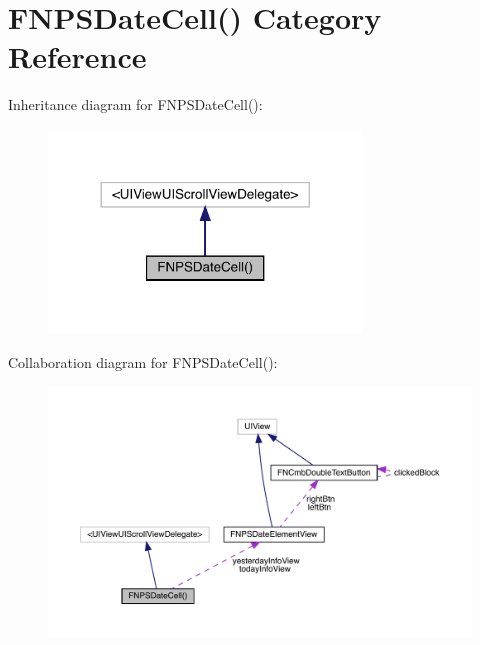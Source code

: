 \hypertarget{category_f_n_p_s_date_cell_07_08}{}\section{F\+N\+P\+S\+Date\+Cell() Category Reference}
\label{category_f_n_p_s_date_cell_07_08}


Inheritance diagram for F\+N\+P\+S\+Date\+Cell()\+:\nopagebreak
\begin{figure}[H]
\begin{center}
\leavevmode
\includegraphics[width=236pt]{category_f_n_p_s_date_cell_07_08__inherit__graph}
\end{center}
\end{figure}


Collaboration diagram for F\+N\+P\+S\+Date\+Cell()\+:\nopagebreak
\begin{figure}[H]
\begin{center}
\leavevmode
\includegraphics[width=350pt]{category_f_n_p_s_date_cell_07_08__coll__graph}
\end{center}
\end{figure}
